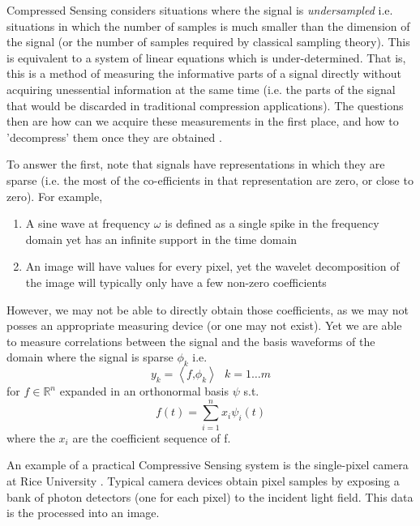 \documentclass[12pt, a4paper]{article}
\begin{document}
Compressed Sensing considers situations where the signal is \textit{undersampled} i.e. situations in which the number of samples is much smaller than the dimension of the signal (or the number of samples required by classical sampling theory). This is equivalent to a system of linear equations which is under-determined.  That is, this is a method of measuring the informative parts of a signal directly without acquiring unessential information at the same time (i.e. the parts of the signal that would be discarded in traditional compression applications). The questions then are how can we acquire these measurements in the first place, and how to 'decompress' them once they are obtained \cite{Donoho2006}. 

To answer the first, note that signals have representations in which they are sparse (i.e. the most of the co-efficients in that representation are zero, or close to zero). For example, 

\begin{enumerate}
\item  A sine wave at frequency \(\omega\) is defined as a single spike in the frequency domain yet has an infinite support in the time domain
\item An image will have values for every pixel, yet the wavelet decomposition of the image will typically only have a few non-zero coefficients
\end{enumerate} 

However, we may not be able to directly obtain those coefficients, as we may not posses an appropriate measuring device (or one may not exist). Yet we are able to measure correlations between the signal and the basis waveforms of the domain where the signal is sparse \(\phi_{k}\) i.e. 
%
\begin{equation}
y_{k} = \left\langle f \text{,} \phi_{k} \right\rangle \text{ } k = 1 \ldots m
\end{equation}
%
for \( f \in \mathbb{R}^n \) expanded in an orthonormal basis \( \psi \) s.t.
%
\begin{equation}
f(t) = \sum_{i = 1}^n x_{i}\psi_{i}(t) 
\end{equation}
%
where the \(x_{i} \) are the coefficient sequence of f. 

An example of a practical Compressive Sensing system is the single-pixel camera at Rice University \cite{Duarte2008}. Typical camera devices obtain pixel samples by exposing a bank of photon detectors (one for each pixel) to the incident light field. This data is the processed into an image.
\end{document}
